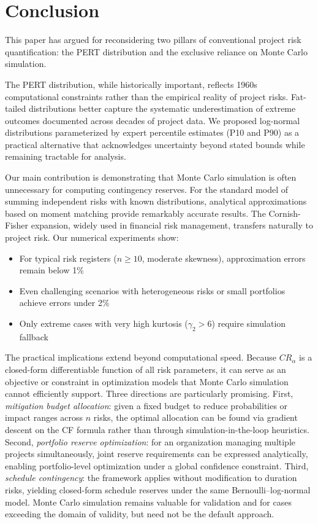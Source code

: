 \documentclass[12pt,a4paper]{article}
\theoremstyle{definition}
\theoremstyle{remark}
\begin{document}
\section{Conclusion}
\label{sec:conclusion}

This paper has argued for reconsidering two pillars of conventional project risk quantification: the PERT distribution and the exclusive reliance on Monte Carlo simulation.

The PERT distribution, while historically important, reflects 1960s computational constraints rather than the empirical reality of project risks. Fat-tailed distributions better capture the systematic underestimation of extreme outcomes documented across decades of project data. We proposed log-normal distributions parameterized by expert percentile estimates (P10 and P90) as a practical alternative that acknowledges uncertainty beyond stated bounds while remaining tractable for analysis.

Our main contribution is demonstrating that Monte Carlo simulation is often unnecessary for computing contingency reserves. For the standard model of summing independent risks with known distributions, analytical approximations based on moment matching provide remarkably accurate results. The Cornish-Fisher expansion, widely used in financial risk management, transfers naturally to project risk. Our numerical experiments show:

\begin{itemize}
    \item For typical risk registers ($n \geq 10$, moderate skewness), approximation errors remain below 1\%
    \item Even challenging scenarios with heterogeneous risks or small portfolios achieve errors under 2\%
    \item Only extreme cases with very high kurtosis ($\gamma_2 > 6$) require simulation fallback
\end{itemize}

The practical implications extend beyond computational speed. Because $CR_\alpha$ is a closed-form differentiable function of all risk parameters, it can serve as an objective or constraint in optimization models that Monte Carlo simulation cannot efficiently support. Three directions are particularly promising. First, \emph{mitigation budget allocation}: given a fixed budget to reduce probabilities or impact ranges across $n$ risks, the optimal allocation can be found via gradient descent on the CF formula rather than through simulation-in-the-loop heuristics. Second, \emph{portfolio reserve optimization}: for an organization managing multiple projects simultaneously, joint reserve requirements can be expressed analytically, enabling portfolio-level optimization under a global confidence constraint. Third, \emph{schedule contingency}: the framework applies without modification to duration risks, yielding closed-form schedule reserves under the same Bernoulli--log-normal model. Monte Carlo simulation remains valuable for validation and for cases exceeding the domain of validity, but need not be the default approach.
\end{document}
